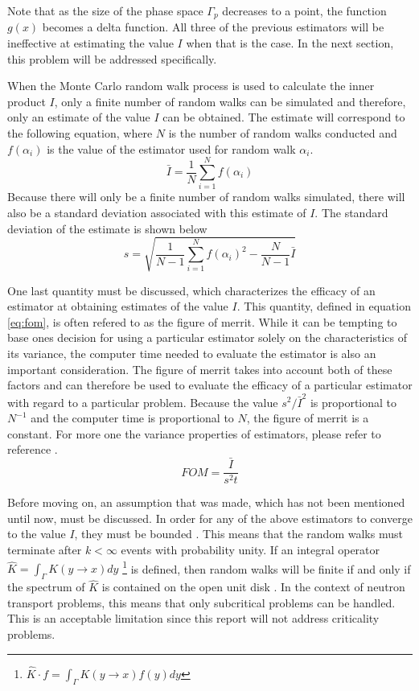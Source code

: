 Note that as the size of the phase space $\Gamma_p$ decreases to a point, the 
function $g(x)$ becomes a delta function. All three of the previous estimators 
will be ineffective at estimating the value $I$ when that is the case. In the 
next section, this problem will be addressed specifically.

When the Monte Carlo random walk process is used to calculate the inner product
$I$, only a finite number of random walks can be simulated and therefore, only 
an estimate of the value $I$ can be obtained. The estimate will
correspond to the following equation, where $N$ is the number of random walks
conducted and $f(\alpha_i)$ is the value of the estimator used for random
walk $\alpha_i$.
\begin{equation}
  \bar{I} = \frac{1}{N} \sum_{i=1}^N f(\alpha_i)
  \label{eq:inner_product_estimate}
\end{equation}
Because there will only be a finite number of random walks simulated, there
will also be a standard deviation associated with this estimate of $I$. The 
standard deviation of the estimate is shown below
\begin{equation}
  s = \sqrt{\frac{1}{N-1}\sum_{i=1}^N f(\alpha_i)^2 - \frac{N}{N-1}\bar{I}}
  \label{eq:inner_product_stddev}
\end{equation}

One last quantity must be discussed, which characterizes the efficacy of
an estimator at obtaining estimates of the value $I$. This quantity, defined
in equation \ref{eq:fom}, is often refered to as the figure of merrit. While it
can be tempting to base ones decision for using a particular estimator solely
on the characteristics of its variance, the computer time needed to evaluate 
the estimator is also an important consideration. The figure of merrit takes
 into account both of these factors and can therefore be used to evaluate the 
efficacy of a particular estimator with regard to a particular problem. 
Because the value $s^2/\bar{I}^2$ is proportional to $N^{-1}$ and the computer 
time is proportional to $N$, the figure of merrit is a constant. For more one
the variance properties of estimators, please refer to reference 
\cite{spanier_monte_1969}.
\begin{equation}
  FOM = \frac{\bar{I}}{s^2t}
  \label{eq:fom}
\end{equation}

Before moving on, an assumption that was made, which has not been mentioned
until now, must be discussed. In order for any of the above estimators to 
converge to the value $I$, they must be bounded \citep{spanier_monte_1969}. This
means that the random walks must terminate after $k < \infty$ events with 
probability unity. If an integral operator $\hat{K} = \int_{\Gamma} K(y \to x)dy$
\footnote{$\hat{K} \cdot f = \int_{\Gamma} K(y \to x)f(y)dy$} is defined, then 
random walks will be finite if and only if the spectrum of $\hat{K}$ is 
contained on the open unit disk \citep{spanier_monte_1969}. In the context of 
neutron transport problems, this means that only subcritical problems can be 
handled. This is an acceptable limitation since this report will not address 
criticality problems.

